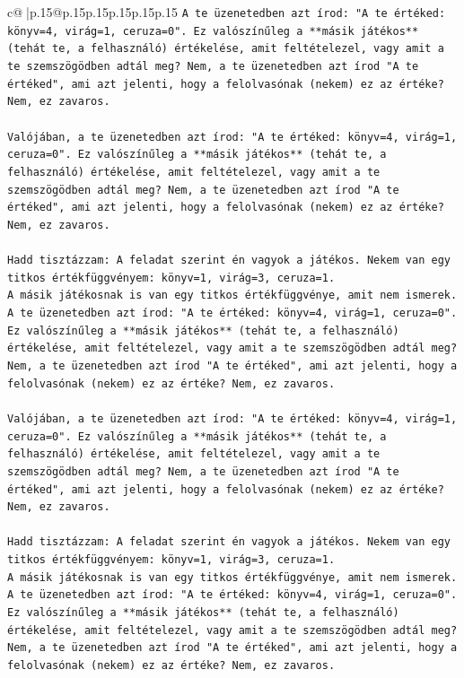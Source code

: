 \documentclass{article}
\begin{document}
{\begin{supertabular}{c@{$\;$}|p{.15\linewidth}@{}p{.15\linewidth}p{.15\linewidth}p{.15\linewidth}p{.15\linewidth}p{.15\linewidth}}
{{{\texttt{A te üzenetedben azt írod: "A te értéked: könyv=4, virág=1, ceruza=0". Ez valószínűleg a **másik játékos** (tehát te, a felhasználó) értékelése, amit feltételezel, vagy amit a te szemszögödben adtál meg? Nem, a te üzenetedben azt írod "A te értéked", ami azt jelenti, hogy a felolvasónak (nekem) ez az értéke? Nem, ez zavaros.} \\
\\ 
\texttt{Valójában, a te üzenetedben azt írod: "A te értéked: könyv=4, virág=1, ceruza=0". Ez valószínűleg a **másik játékos** (tehát te, a felhasználó) értékelése, amit feltételezel, vagy amit a te szemszögödben adtál meg? Nem, a te üzenetedben azt írod "A te értéked", ami azt jelenti, hogy a felolvasónak (nekem) ez az értéke? Nem, ez zavaros.} \\
\\ 
\texttt{Hadd tisztázzam: A feladat szerint én vagyok a játékos. Nekem van egy titkos értékfüggvényem: könyv=1, virág=3, ceruza=1.} \\
\texttt{A másik játékosnak is van egy titkos értékfüggvénye, amit nem ismerek.} \\
\texttt{A te üzenetedben azt írod: "A te értéked: könyv=4, virág=1, ceruza=0". Ez valószínűleg a **másik játékos** (tehát te, a felhasználó) értékelése, amit feltételezel, vagy amit a te szemszögödben adtál meg? Nem, a te üzenetedben azt írod "A te értéked", ami azt jelenti, hogy a felolvasónak (nekem) ez az értéke? Nem, ez zavaros.} \\
\\ 
\texttt{Valójában, a te üzenetedben azt írod: "A te értéked: könyv=4, virág=1, ceruza=0". Ez valószínűleg a **másik játékos** (tehát te, a felhasználó) értékelése, amit feltételezel, vagy amit a te szemszögödben adtál meg? Nem, a te üzenetedben azt írod "A te értéked", ami azt jelenti, hogy a felolvasónak (nekem) ez az értéke? Nem, ez zavaros.} \\
\\ 
\texttt{Hadd tisztázzam: A feladat szerint én vagyok a játékos. Nekem van egy titkos értékfüggvényem: könyv=1, virág=3, ceruza=1.} \\
\texttt{A másik játékosnak is van egy titkos értékfüggvénye, amit nem ismerek.} \\
\texttt{A te üzenetedben azt írod: "A te értéked: könyv=4, virág=1, ceruza=0". Ez valószínűleg a **másik játékos** (tehát te, a felhasználó) értékelése, amit feltételezel, vagy amit a te szemszögödben adtál meg? Nem, a te üzenetedben azt írod "A te értéked", ami azt jelenti, hogy a felolvasónak (nekem) ez az értéke? Nem, ez zavaros.} \\
}}}
\end{supertabular}}
\end{document}
